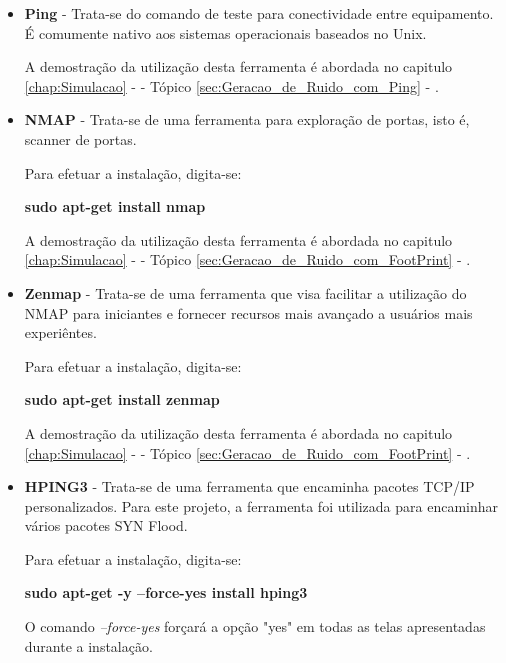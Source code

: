 			\begin{itemize}
				
				\item \textbf{Ping} - Trata-se do comando de teste para conectividade entre equipamento. É comumente nativo aos sistemas operacionais baseados no Unix.

				A demostração da utilização desta ferramenta é abordada no capitulo \ref{chap:Simulacao} -  - Tópico \ref{sec:Geracao_de_Ruido_com_Ping} - .
				

				\item \textbf{NMAP} - Trata-se de uma ferramenta para exploração de portas, isto é, scanner de portas. \cite{nmap}

				Para efetuar a instalação, digita-se:
				\begin{framed}
					\textbf{sudo apt-get install nmap}
				\end{framed}

				A demostração da utilização desta ferramenta é abordada no capitulo \ref{chap:Simulacao} -  - Tópico \ref{sec:Geracao_de_Ruido_com_FootPrint} - .


				\item \textbf{Zenmap} - Trata-se de uma ferramenta que visa facilitar a utilização do NMAP para iniciantes e fornecer recursos mais avançado a usuários mais experiêntes. \cite{zenmap}

				Para efetuar a instalação, digita-se:
				\begin{framed}
					\textbf{sudo apt-get install zenmap}
				\end{framed}

				A demostração da utilização desta ferramenta é abordada no capitulo \ref{chap:Simulacao} -  - Tópico \ref{sec:Geracao_de_Ruido_com_FootPrint} - .


				\item \textbf{HPING3} - Trata-se de uma ferramenta que encaminha pacotes TCP/IP personalizados. Para este projeto, a ferramenta foi utilizada para encaminhar vários pacotes SYN Flood. 

				Para efetuar a instalação, digita-se:
				\begin{framed}
					\textbf{sudo apt-get -y --force-yes install hping3}
				\end{framed}

				O comando \emph{--force-yes} forçará a opção "yes" em todas as telas apresentadas durante a instalação.


\end{itemize}

